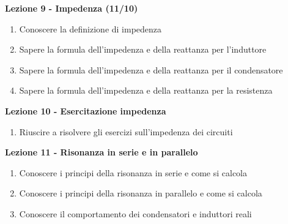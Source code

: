 \documentclass{article}
\begin{document}
\begin{center}
	\textbf{Lezione 9 - Impedenza (11/10)}
	\begin{enumerate}
	\item Conoscere la definizione di impedenza
	\item Sapere la formula dell'impedenza e della reattanza per l'induttore
	\item Sapere la formula dell'impedenza e della reattanza per il condensatore
	\item Sapere la formula dell'impedenza e della reattanza per la resistenza
	\end{enumerate}

	\textbf{Lezione 10 - Esercitazione impedenza}
	\begin{enumerate}
	\item Riuscire a risolvere gli esercizi sull'impedenza dei circuiti
	\end{enumerate}

	\textbf{Lezione 11 - Risonanza in serie e in parallelo}
	\begin{enumerate}
	\item Conoscere i principi della risonanza in serie e come si calcola
	\item Conoscere i principi della risonanza in parallelo e come si calcola
	\item Conoscere il comportamento dei condensatori e induttori reali
	\end{enumerate}
	
	
	\end{center}
\end{document}
